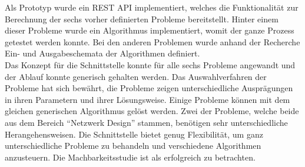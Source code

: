 Als Prototyp wurde ein REST API implementiert, welches die Funktionalität zur Berechnung der sechs vorher definierten Probleme bereitstellt. Hinter einem dieser Probleme wurde ein 
Algorithmus implementiert, womit der ganze Prozess getestet werden konnte. Bei den anderen Problemen wurde anhand der Recherche Ein- und Ausgabeschemata der Algorithmen definiert.\\

Das Konzept für die Schnittstelle konnte für alle sechs Probleme angewandt und der Ablauf konnte generisch gehalten werden. Das Auswahlverfahren der Probleme hat sich bewährt, die Probleme 
zeigen unterschiedliche Ausprägungen in ihren Parametern und ihrer Lösungsweise. Einige Probleme können mit dem gleichen generischen Algorithmus gelöst werden. Zwei der Probleme, welche 
beide aus dem Bereich "`Netzwerk Design"' stammen, benötigen sehr unterschiedliche Herangehensweisen. Die Schnittstelle bietet genug Flexibilität, um ganz unterschiedliche Probleme zu behandeln und 
verschiedene Algorithmen anzusteuern. Die Machbarkeitsstudie ist als erfolgreich zu betrachten.